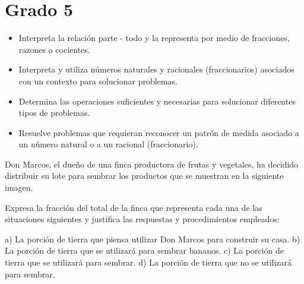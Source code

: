 \section{Grado 5}\label{grado:5}


\evidencias

\begin{itemize}
  \item Interpreta la relación parte - todo y la representa por medio de fracciones, razones o cocientes.
  \item Interpreta y utiliza números naturales y racionales (fraccionarios) asociados con un contexto para solucionar problemas.
  \item Determina las operaciones suficientes y necesarias para solucionar diferentes tipos de problemas.
  \item Resuelve problemas que requieran reconocer un patrón de medida asociado a un número natural o a un racional (fraccionario).
\end{itemize}

\ejemplo

Don Marcos, el dueño de una finca productora de frutas y vegetales, ha decidido distribuir su lote para sembrar los productos que se muestran en la siguiente imagen.


Expresa la fracción del total de la finca que representa cada una de las situaciones siguientes y justifica las respuestas y procedimientos empleados:

a) La porción de tierra que piensa utilizar Don Marcos para construir su casa. b) La porción de tierra que se utilizará para sembrar bananos. c) La porción de tierra que se utilizará para sembrar. d) La porción de tierra que no se utilizará para sembrar.



\evidencias

